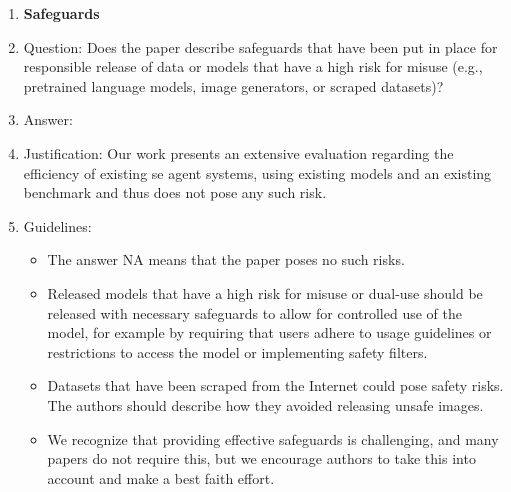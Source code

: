 \documentclass{article}
\begin{document}
\begin{enumerate}
\item {\bf Safeguards}
    \item[] Question: Does the paper describe safeguards that have been put in place for responsible release of data or models that have a high risk for misuse (e.g., pretrained language models, image generators, or scraped datasets)?
    \item[] Answer: \answerNA{}{} %
    \item[] Justification: Our work presents an extensive evaluation regarding the efficiency of existing \ac{se} agent systems, using existing models and an existing benchmark and thus does not pose any such risk.
    \item[] Guidelines:
    \begin{itemize}
        \item The answer NA means that the paper poses no such risks.
        \item Released models that have a high risk for misuse or dual-use should be released with necessary safeguards to allow for controlled use of the model, for example by requiring that users adhere to usage guidelines or restrictions to access the model or implementing safety filters. 
        \item Datasets that have been scraped from the Internet could pose safety risks. The authors should describe how they avoided releasing unsafe images.
        \item We recognize that providing effective safeguards is challenging, and many papers do not require this, but we encourage authors to take this into account and make a best faith effort.
    \end{itemize}


\end{enumerate}
\end{document}
